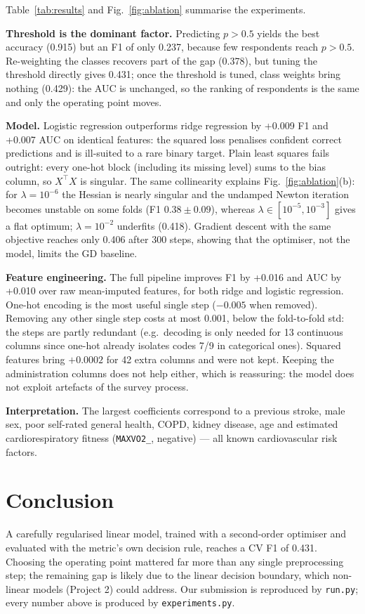 \documentclass[10pt,conference,compsocconf]{IEEEtran}
\begin{document}
Table~\ref{tab:results} and Fig.~\ref{fig:ablation} summarise the
experiments.

\textbf{Threshold is the dominant factor.} Predicting $p>0.5$ yields the
best accuracy (0.915) but an F1 of only 0.237, because few respondents reach
$p>0.5$. Re-weighting the classes recovers part of the gap (0.378), but
tuning the threshold directly gives 0.431; once the threshold is tuned,
class weights bring nothing (0.429): the AUC is unchanged, so the ranking
of respondents is the same and only the operating point moves.

\textbf{Model.} Logistic regression outperforms ridge regression by +0.009
F1 and +0.007 AUC on identical features: the squared loss penalises
confident correct predictions and is ill-suited to a rare binary target.
Plain least squares fails outright: every one-hot block (including its
missing level) sums to the bias column, so $X^\top X$ is singular. The same
collinearity explains Fig.~\ref{fig:ablation}(b): for $\lambda=10^{-6}$ the
Hessian is nearly singular and the undamped Newton iteration becomes
unstable on some folds (F1 $0.38\pm0.09$), whereas $\lambda\in[10^{-5},
10^{-3}]$ gives a flat optimum; $\lambda=10^{-2}$ underfits (0.418).
Gradient descent with the same objective reaches only 0.406 after 300 steps,
showing that the optimiser, not the model, limits the GD baseline.

\textbf{Feature engineering.} The full pipeline improves F1 by +0.016 and
AUC by +0.010 over raw mean-imputed features, for both ridge and logistic
regression. One-hot encoding is the most useful single step ($-0.005$ when
removed). Removing any other single step costs at most 0.001, below the
fold-to-fold std: the steps are partly redundant (e.g.\ decoding is only
needed for 13 continuous columns since one-hot already isolates codes 7/9 in
categorical ones). Squared features bring $+0.0002$ for 42 extra columns
and were not kept. Keeping the administration columns does not help either,
which is reassuring: the model does not exploit artefacts of the survey
process.

\textbf{Interpretation.} The largest coefficients correspond to a previous
stroke, male sex, poor self-rated general health, COPD, kidney disease, age
and estimated cardiorespiratory fitness (\texttt{MAXVO2\_}, negative)
--- all known cardiovascular risk factors.

\section{Conclusion}
A carefully regularised linear model, trained with a second-order optimiser
and evaluated with the metric's own decision rule, reaches a CV F1 of 0.431.
Choosing the operating point mattered far more than any single
preprocessing step; the remaining gap is likely due to the linear decision
boundary, which non-linear models (Project 2) could address. Our submission
is reproduced by \texttt{run.py}; every number above is produced by
\texttt{experiments.py}.
\end{document}
